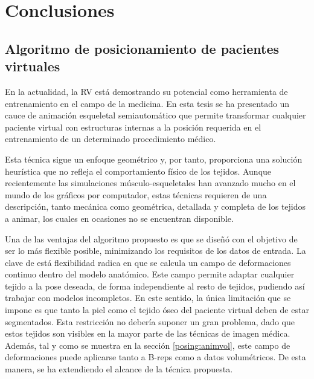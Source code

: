 \chapter*{Conclusiones}
\label{cap:conclu}

\section{Algoritmo de posicionamiento de pacientes virtuales}
\label{conclu:posing}

En la actualidad, la \ac{RV} está demostrando su potencial como herramienta de entrenamiento en el campo de la medicina. %
En esta tesis se ha presentado un cauce de animación esqueletal semiautomático que permite transformar cualquier paciente virtual con estructuras internas a la posición requerida en el entrenamiento de un determinado procedimiento médico.

Esta técnica sigue un enfoque geométrico y, por tanto, proporciona una solución heurística que no refleja  el comportamiento físico de los tejidos. Aunque recientemente las simulaciones músculo-esqueletales han avanzado mucho en el mundo de los gráficos por computador, estas técnicas requieren de una descripción, tanto mecánica como geométrica, detallada y completa de los tejidos a animar, los cuales en ocasiones no se encuentran disponible. 

Una de las ventajas del algoritmo propuesto es que se diseñó con el objetivo de ser lo más flexible posible, minimizando los requisitos de los datos de entrada. La clave de está flexibilidad radica en que se calcula un campo de deformaciones continuo dentro del modelo anatómico. Este campo permite adaptar cualquier tejido a la pose deseada, de forma independiente al resto de tejidos, pudiendo así trabajar con modelos incompletos. En este sentido, la única limitación que se impone es que tanto la piel como el tejido óseo del paciente virtual deben de estar segmentados. Esta restricción no debería suponer un gran problema, dado que estos tejidos son visibles en la mayor parte de las técnicas de imagen médica. Además, tal y como se muestra en la sección \ref{posing:animvol}, este campo de deformaciones puede aplicarse tanto a \acs{B-rep}s como a datos volumétricos. De esta manera, se ha extendiendo el alcance de la técnica propuesta.

